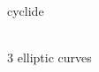 \documentclass{article}
\begin{document}
%
\begin{figure}[ht]
    \centering
    
    \setcyc\\[3ex]
    {\Huge cyclide}
\end{figure}
%
\begin{figure}[ht]
    \centering
    
    \setmc\\[3ex]
    {\Huge 3 elliptic curves}
\end{figure}
%
\end{document}
